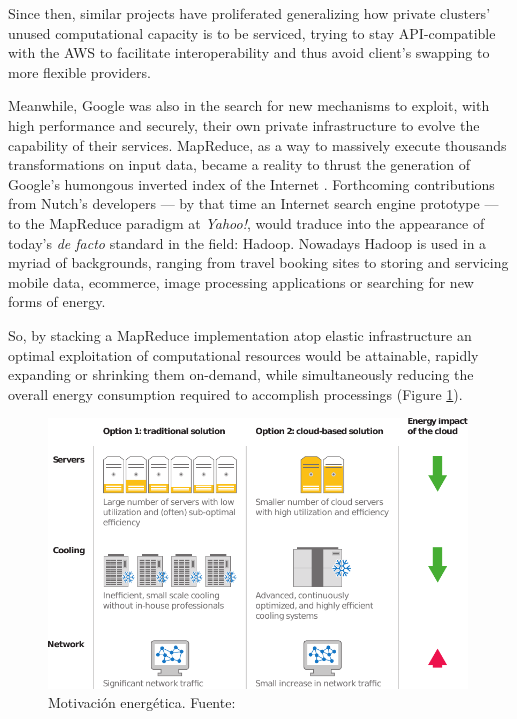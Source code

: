 Since then, similar projects have proliferated generalizing how private clusters' unused computational capacity is to be serviced, trying to stay API-compatible with the AWS to facilitate interoperability and thus avoid client's swapping to more flexible providers.

Meanwhile, Google was also in the search for new mechanisms to exploit, with high performance and securely, their own private infrastructure to evolve the capability of their services. MapReduce, as a way to massively execute thousands transformations on input data, became a reality to thrust the generation of Google's humongous inverted index of the Internet \cite{googlemapreduce}. Forthcoming contributions from Nutch's developers --- by that time an Internet search engine prototype --- to the MapReduce paradigm at \emph{Yahoo!}, would traduce into the appearance of today's \emph{de facto} standard in the field: Hadoop. Nowadays Hadoop is used in a myriad of backgrounds, ranging from travel booking sites to storing and servicing mobile data, ecommerce, image processing applications or searching for new forms of energy.

So, by stacking a MapReduce implementation atop elastic infrastructure an optimal exploitation of computational resources would be attainable, rapidly expanding or shrinking them on-demand, while simultaneously reducing the overall energy consumption required to accomplish processings (Figure \ref{fig:energysavings}).

\begin{figure}[tbp]
\begin{center}
\includegraphics[width=0.99\textwidth]{imagenes/002.pdf}
 \caption{Motivaci\'on energ\'etica. Fuente: \cite{googleapps}}
\label{fig:energysavings}
\end{center}
\end{figure}




